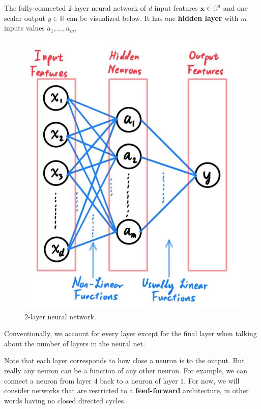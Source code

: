 \documentclass{article}
\begin{document}
    \begin{example}
      The fully-connected 2-layer neural network of $d$ input features $\mathbf{x} \in \mathbb{R}^d$ and one scalar output $y \in \mathbb{R}$ can be visualized below. It has one \textbf{hidden layer} with $m$ inputs values $a_1, \ldots, a_m$. 
      \begin{figure}[H]
        \centering 
        \includegraphics[scale=0.2]{img/01_MLP/2_layer_neural_net.jpg}
        \caption{2-layer neural network. } 
        \label{fig:2_layer_neural_net}
      \end{figure}
      Conventionally, we account for every layer except for the final layer when talking about the number of layers in the neural net. 
    \end{example}

    Note that each layer corresponds to how close a neuron is to the output. But really any neuron can be a function of any other neuron. For example, we can connect a neuron from layer $4$ back to a neuron of layer $1$. For now, we will consider networks that are restricted to a \textbf{feed-forward} architecture, in other words having no closed directed cycles. 
\end{document}
